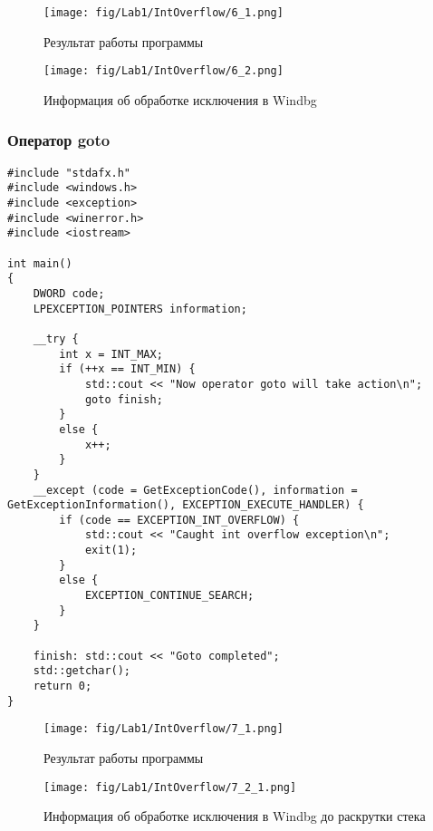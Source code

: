\begin{figure}[H]
    \begin{center}
        \texttt{[image: fig/Lab1/IntOverflow/6\_1.png]}
        \caption{Результат работы программы}
        \label{pic:6_1}
    \end{center}
\end{figure}

\begin{figure}[H]
    \begin{center}
        \texttt{[image: fig/Lab1/IntOverflow/6\_2.png]}
        \caption{Информация об обработке исключения в Windbg}
        \label{pic:6_2}
    \end{center}
\end{figure}

\subsubsection{Оператор goto}
\begin{lstlisting}[caption=Выход из блока с помозью оператора goto]
#include "stdafx.h"
#include <windows.h>
#include <exception>
#include <winerror.h>
#include <iostream>

int main()
{
    DWORD code;
    LPEXCEPTION_POINTERS information;

    __try {
        int x = INT_MAX;
        if (++x == INT_MIN) {
            std::cout << "Now operator goto will take action\n";
            goto finish;
        }
        else {
            x++;
        }
    }
    __except (code = GetExceptionCode(), information = GetExceptionInformation(), EXCEPTION_EXECUTE_HANDLER) {
        if (code == EXCEPTION_INT_OVERFLOW) {
            std::cout << "Caught int overflow exception\n";
            exit(1);
        }
        else {
            EXCEPTION_CONTINUE_SEARCH;
        }
    }

    finish: std::cout << "Goto completed";
    std::getchar();
    return 0;
}
\end{lstlisting}

\begin{figure}[H]
    \begin{center}
        \texttt{[image: fig/Lab1/IntOverflow/7\_1.png]}
        \caption{Результат работы программы}
        \label{pic:7_1}
    \end{center}
\end{figure}

\begin{figure}[H]
    \begin{center}
        \texttt{[image: fig/Lab1/IntOverflow/7\_2\_1.png]}
        \caption{Информация об обработке исключения в Windbg до раскрутки стека}
        \label{pic:7_2_1}
    \end{center}
\end{figure}

